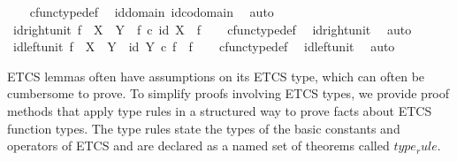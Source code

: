 \begin{isabellebody}
%
\isadelimproof
\ \ %
\endisadelimproof
%
\isatagproof
{}\isamarkupfalse%
\ cfunc{\isacharunderscore}{\kern0pt}type{\isacharunderscore}{\kern0pt}def\ \isamarkupfalse%
\ id{\isacharunderscore}{\kern0pt}domain\ id{\isacharunderscore}{\kern0pt}codomain\ \isamarkupfalse%
\ auto%
\endisatagproof
{\isafoldproof}%
%
\isadelimproof
\isanewline
%
\endisadelimproof
\isanewline
{}\isamarkupfalse%
\ id{\isacharunderscore}{\kern0pt}right{\isacharunderscore}{\kern0pt}unit{}{\isacharcolon}{\kern0pt}\ {\isachardoublequoteopen}f\ {\isacharcolon}{\kern0pt}\ X\ {\isasymrightarrow}\ Y\ {\isasymLongrightarrow}\ f\ {\isasymcirc}\isactrlsub c\ id\ X\ {\isacharequal}{\kern0pt}\ f{\isachardoublequoteclose}\isanewline
%
\isadelimproof
\ \ %
\endisadelimproof
%
\isatagproof
{}\isamarkupfalse%
\ cfunc{\isacharunderscore}{\kern0pt}type{\isacharunderscore}{\kern0pt}def\ \isamarkupfalse%
\ id{\isacharunderscore}{\kern0pt}right{\isacharunderscore}{\kern0pt}unit\ \isamarkupfalse%
\ auto%
\endisatagproof
{\isafoldproof}%
%
\isadelimproof
\isanewline
%
\endisadelimproof
\isanewline
{}\isamarkupfalse%
\ id{\isacharunderscore}{\kern0pt}left{\isacharunderscore}{\kern0pt}unit{}{\isacharcolon}{\kern0pt}\ {\isachardoublequoteopen}f\ {\isacharcolon}{\kern0pt}\ X\ {\isasymrightarrow}\ Y\ {\isasymLongrightarrow}\ id\ Y\ {\isasymcirc}\isactrlsub c\ f\ {\isacharequal}{\kern0pt}\ f{\isachardoublequoteclose}\isanewline
%
\isadelimproof
\ \ %
\endisadelimproof
%
\isatagproof
{}\isamarkupfalse%
\ cfunc{\isacharunderscore}{\kern0pt}type{\isacharunderscore}{\kern0pt}def\ \isamarkupfalse%
\ id{\isacharunderscore}{\kern0pt}left{\isacharunderscore}{\kern0pt}unit\ \isamarkupfalse%
\ auto%
\endisatagproof
{\isafoldproof}%
%
\isadelimproof
%
\endisadelimproof
%
\isadelimdocument
%
\endisadelimdocument
%
\isatagdocument
%
\isamarkuptrue%
%
\endisatagdocument
{\isafolddocument}%
%
\isadelimdocument
%
\endisadelimdocument
%
\begin{isamarkuptext}%
ETCS lemmas often have assumptions on its ETCS type, which can often be cumbersome to prove.
  To simplify proofs involving ETCS types, we provide proof methods that apply type rules in a
  structured way to prove facts about ETCS function types.
  The type rules state the types of the basic constants and operators of ETCS and are declared as
  a named set of theorems called $type_rule$.%

\end{isamarkuptext}
\end{isabellebody}

